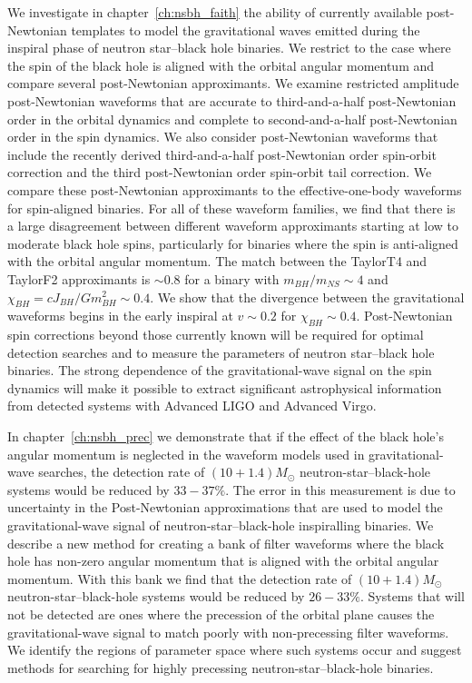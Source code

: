 We investigate in chapter~\ref{ch:nsbh_faith} the ability of currently available
post-Newtonian templates to model the gravitational waves emitted during the
inspiral phase of neutron star--black hole binaries. We restrict to the case where the spin of the
black hole is aligned with the orbital angular momentum and compare several
post-Newtonian approximants. We examine
restricted amplitude post-Newtonian waveforms that are accurate to
third-and-a-half post-Newtonian order in the orbital dynamics and complete to second-and-a-half post-Newtonian order
in the spin dynamics. We also consider post-Newtonian waveforms that include the recently derived third-and-a-half
post-Newtonian order spin-orbit correction and the third post-Newtonian order spin-orbit tail correction. 
We compare these post-Newtonian approximants to the effective-one-body waveforms for spin-aligned binaries.
For all of these waveform families, we find that
 there is a large disagreement between
different waveform approximants starting at low to moderate black hole spins,
particularly for binaries where the spin is anti-aligned with the orbital
angular momentum. The match between the TaylorT4 and TaylorF2 approximants is $\sim 0.8$ for a binary with $m_{BH}/m_{NS} \sim 4$ and 
$\chi_{BH} = cJ_{BH}/Gm^2_{BH} \sim 0.4$.
We show that the divergence between the gravitational waveforms begins in the early
inspiral at $v \sim 0.2$ for $\chi_{BH} \sim 0.4$.  Post-Newtonian spin corrections beyond those currently
known will be required for optimal detection searches and to measure the
parameters of neutron star--black hole binaries. The strong dependence of 
the gravitational-wave signal on the spin dynamics will make it possible to extract significant
astrophysical information from detected systems with Advanced LIGO and
Advanced Virgo.

In chapter~\ref{ch:nsbh_prec} we demonstrate that if the effect of the black
hole's angular momentum is neglected in the waveform models used in
gravitational-wave searches, the detection rate of $(10+1.4)M_{\odot}$
neutron-star--black-hole
systems would be reduced by $33 - 37\%$. The error in this measurement is due
to uncertainty in the Post-Newtonian approximations that are used to model the
gravitational-wave signal of neutron-star--black-hole inspiralling binaries. We
describe a new method for creating a bank of filter waveforms where the black
hole has non-zero angular momentum that is aligned with the orbital angular
momentum. With this bank we find that the detection rate of $(10+1.4)M_{\odot}$
neutron-star--black-hole systems would be reduced by $26-33\%$. Systems that
will not be detected are ones where the precession of the orbital plane causes
the gravitational-wave signal to match poorly with non-precessing filter
waveforms. We identify the regions of parameter space where such systems occur
and suggest methods for searching for highly precessing
neutron-star--black-hole binaries.

